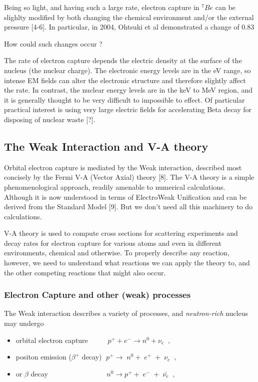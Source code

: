 \documentclass[11pt]{amsart}
\begin{document}
Being so light, and having such a large rate, electron capture in $^{7}Be$ can be slighlty modified by both changing the chemical environment and/or the external pressure [4-6]. In particular, in 2004, Ohtsuki et al demonstrated a change of 0.83%

How could such changes occur ?

The rate of electron capture depends the electric density at the surface of the nucleus (the nuclear charge).   The electronic energy levels are in the eV range, so intense EM fields can alter the electronic structure and therefore slightly affect the rate. In contrast, the nuclear energy levels are in the keV to MeV region, and it is generally thought to be very difficult to impossible to effect. Of particular practical interest is using very large electric fields for accelerating Beta decay for disposing of nuclear waste [?].

\subsection{The Weak Interaction and V-A theory}

Orbital electron capture is mediated by the Weak interaction, described most concisely by the Fermi V-A (Vector Axial) theory [8].
The V-A theory is a simple phenomenological approach, readily amenable to numerical calculations.   Although it is now understood in terms of ElectroWeak Unification and can be derived from the Standard Model [9]. But we don't need all this machinery to do calculations.

V-A theory is used to compute cross sections for scattering experiments and decay rates for electron capture for various atoms and even in different environments, chemical and otherwise.  To properly describe any reaction, however, we need to understand what reactions we can apply the theory to, and the other competing reactions that might also occur.

\subsubsection{Electron Capture and other (weak) processes} 

The Weak interaction describes a variety of processes, and \emph{neutron-rich} nucleus may undergo

\begin{itemize}
\item orbital electron capture $\;\;\;\;\;\;\;\;\;p^{+}+e^{-} \rightarrow n^{0}+\nu_{e}\;\;,$

\item positon emission ($\beta^{+}$ decay) $\;p^{+}\rightarrow\;n^{0}+\;e^{+}\;+\;\nu_{e}\;\;,$

\item or $\beta$ decay $\;\;\;\;\;\;\;\;\;\;\;\;\;\;\;\;\;\;\;\;\;\;\;\;\;\;\;\;\;n^{0}\rightarrow p^{+}+\;e^{-}\;+\;\bar{\nu_{e}}\;\;,$
\end{itemize}
\end{document}
